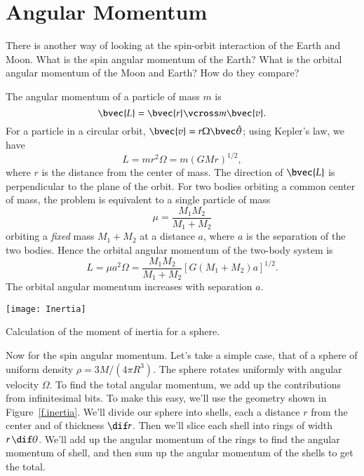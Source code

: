 \section{Angular Momentum}\label{s.angular-momentum}
There is another way of looking at the spin-orbit interaction of the Earth and Moon.  What is the spin angular momentum of the Earth? What is the orbital angular momentum of the Moon and Earth? How do they compare?

The angular momentum of a particle of mass $m$ is
\begin{equation}\label{e.def-L}
	\bvec{L} = \bvec{r}\vcross m\bvec{v}.
\end{equation}
For a particle in a circular orbit, $\bvec{v} = r\Omega \thetahat$; using Kepler's law, we have
\[	L = mr^{2}\Omega = m\left(GMr\right)^{1/2}, \]
where $r$ is the distance from the center of mass.  The direction of $\bvec{L}$ is perpendicular to the plane of the orbit.  For two bodies orbiting a common center of mass, the problem is equivalent to a single particle of mass
\[ \mu = \frac{M_{1}M_{2}}{M_{1}+M_{2}} \]
orbiting a \emph{fixed} mass $M_{1}+M_{2}$ at a distance $a$, where $a$ is the separation of the two bodies.  Hence the orbital angular momentum of the two-body system is
\begin{equation}\label{orbital-2-two-body}
	L = \mu a^{2}\Omega = \frac{M_{1}M_{2}}{M_{1}+M_{2}}\left[G\left(M_{1}+M_{2}\right)a\right]^{1/2}.
\end{equation}
The orbital angular momentum increases with separation $a$.

\begin{marginfigure}
\texttt{[image: Inertia]}
\caption{Calculation of the moment of inertia for a sphere. \label{f.inertia}}
\end{marginfigure}

Now for the spin angular momentum.  Let's take a simple case, that of a sphere of uniform density $\rho = 3M/(4\pi R^{3})$.  The sphere rotates uniformly with angular velocity $\Omega$.  To find the total angular momentum, we add up the contributions from infinitesimal bits.  To make this easy, we'll use the geometry shown in Figure~\ref{f.inertia}.  We'll divide our sphere into shells, each a distance $r$ from the center and of thickness $\dif r$.  Then we'll slice each shell into rings of width $r\,\dif\theta$.  We'll add up the angular momentum of the rings to find the angular momentum of shell, and then sum up the angular momentum of the shells to get the total.

